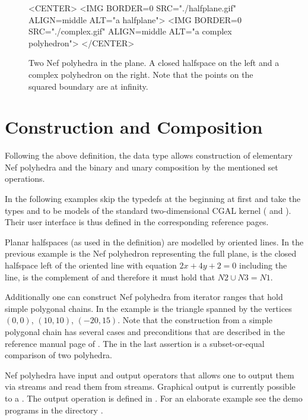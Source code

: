 \begin{figure}[htbp]
\begin{ccTexOnly}
\begin{center}
\end{center}
\end{ccTexOnly}
\caption{Two Nef polyhedra in the plane. A closed halfspace on the 
left and a complex polyhedron on the right. Note that the points 
on the squared boundary are at infinity.}\label{nefexamples}
\begin{ccHtmlOnly}
<CENTER>
<IMG BORDER=0 SRC="./halfplane.gif" ALIGN=middle
ALT="a halfplane">
<IMG BORDER=0 SRC="./complex.gif" ALIGN=middle
ALT="a complex polyhedron">
</CENTER>
\end{ccHtmlOnly}
\end{figure}      

\section{Construction and Composition}

Following the above definition, the data type
 allows construction of elementary Nef
polyhedra and the binary and unary composition by the mentioned set
operations.

In the following examples skip the typedefs at the beginning at first
and take the types  and  to be models of the
standard two-dimensional CGAL kernel (
and ). Their user interface is thus defined in
the corresponding reference pages.


Planar halfspaces (as used in the definition) are modelled by oriented
lines. In the previous example  is the Nef polyhedron
representing the full plane,  is the closed halfspace left of
the oriented line with equation $2x + 4y + 2 = 0$ including the line,
 is the complement of  and therefore it must hold that
$N2 \cup N3 = N1$.

Additionally one can construct Nef polyhedra from iterator ranges that
hold simple polygonal chains. In the example  is the triangle
spanned by the vertices $(0,0)$, $(10,10)$, $(-20,15)$.  Note that the
construction from a simple polygonal chain has several cases and
preconditions that are described in the reference manual page of
. The  in the last assertion
is a subset-or-equal comparison of two polyhedra.

Nef polyhedra have input and output operators that allows one to
output them via streams and read them from streams. Graphical output
is currently possible to a . The output
operation is defined in
. For an elaborate
example see the demo programs in the directory .

